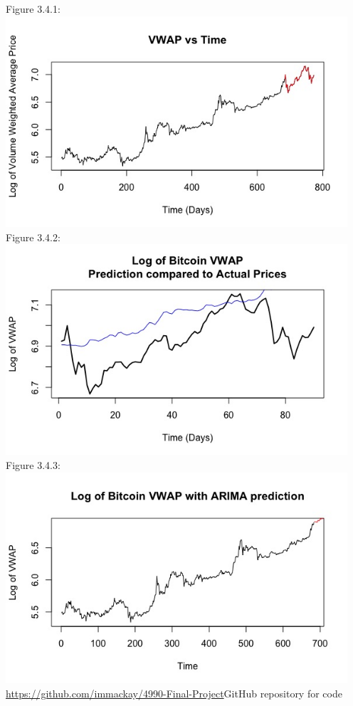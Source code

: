 \documentclass[12pt]{article}
\begin{document}
  Figure 3.4.1:\\
  \includegraphics[width=5in]{plots/ts_plot1.jpeg}\\
  Figure 3.4.2:\\
  \includegraphics[width=5in]{plots/ts_plot5.jpeg}\\
  Figure 3.4.3:\\
  \includegraphics[width=5in]{plots/ts_plot6.jpeg}\\


\url{https://github.com/immackay/4990-Final-Project}{GitHub repository for code}



\end{document}
